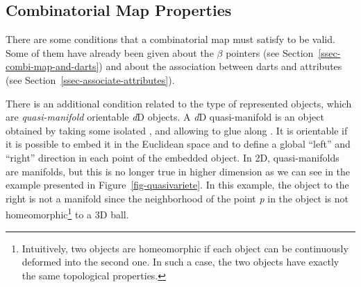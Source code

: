 \subsection{Combinatorial Map Properties}\label{ssec-combimap-validity}
There are some conditions that a combinatorial map must satisfy to be
valid. Some of them have already been given about the $\beta$ pointers
(see Section~\ref{ssec-combi-map-and-darts}) and about the association
between darts and attributes (see
Section~\ref{ssec-associate-attributes}).

There is an additional condition related to the type of represented
objects, which are \emph{quasi-manifold} orientable \emph{d}D objects.  A
\emph{d}D quasi-manifold is an object obtained by taking some isolated
, and allowing to glue  along . It is
orientable if it is possible to embed it in the Euclidean space and to
define a global ``left'' and ``right'' direction in each point of the
embedded object.  In 2D, quasi-manifolds are manifolds, but this is no
longer true in higher dimension as we can see in the example presented
in Figure~\ref{fig-quasivariete}.  In this example, the object to the
right is not a manifold since the neighborhood of the point \emph{p} in the
object is not homeomorphic\footnote{Intuitively, two objects are
  homeomorphic if each object can be continuously deformed into the
  second one.  In such a case, the two objects have exactly the same
  topological properties.}  to a 3D ball.
%
